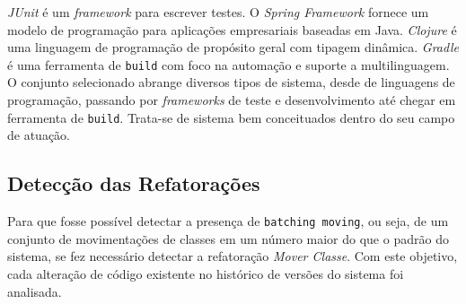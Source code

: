 \documentclass[12pt]{article}
\begin{document}
\textsl{JUnit} é um \textit{framework} para escrever testes. O \textsl{Spring Framework} fornece um modelo de programação para aplicações empresariais baseadas em Java. \textsl{Clojure} é uma linguagem de programação de propósito geral com tipagem dinâmica. \textsl{Gradle} é uma ferramenta de \texttt{build} com foco na automação e suporte a multilinguagem. O conjunto selecionado abrange diversos tipos de sistema, desde de linguagens de programação, passando por \textit{frameworks} de teste e desenvolvimento até chegar em ferramenta de \texttt{build}. Trata-se de sistema bem conceituados dentro do seu campo de atuação.

\begin{table}[htb]
	\centering
	\caption{Projetos Analisados. Os dados apresentados tem como referência 22/06/2016.}
	\label{tab:projetos}
\end{table}


\subsection{Detecção das Refatorações}
\label{subsec:deteccao_refatoracoes}


Para que fosse possível detectar a presença de \texttt{batching moving}, ou seja, de um conjunto de movimentações de classes em um número maior do que o padrão do sistema, se fez necessário detectar a refatoração \textit{Mover Classe}. Com este objetivo, cada alteração de código existente no histórico de versões do sistema foi analisada. 
\end{document}
